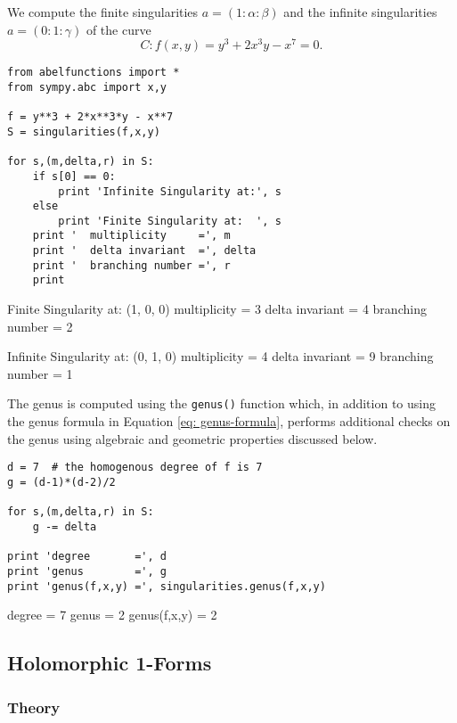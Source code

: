 We compute the finite singularities $a = (1 : \alpha : \beta)$ and the
infinite singularities $a = (0 : 1 : \gamma)$ of the curve
\[
    C : f(x,y) = y^3 + 2x^3y - x^7 = 0.
\]
\begin{lstlisting}
from abelfunctions import *
from sympy.abc import x,y

f = y**3 + 2*x**3*y - x**7
S = singularities(f,x,y)

for s,(m,delta,r) in S:
    if s[0] == 0:
        print 'Infinite Singularity at:', s
    else
        print 'Finite Singularity at:  ', s
    print '  multiplicity     =', m
    print '  delta invariant  =', delta
    print '  branching number =', r
    print
\end{lstlisting}
\begin{pyoutput}
Finite Singularity at:   (1, 0, 0)
  multiplicity     = 3
  delta invariant  = 4
  branching number = 2

Infinite Singularity at: (0, 1, 0)
  multiplicity     = 4
  delta invariant  = 9
  branching number = 1
\end{pyoutput}
The genus is computed using the {\tt genus()} function which, in
addition to using the genus formula in Equation \eqref{eq:
  genus-formula}, performs additional checks on the genus using
algebraic and geometric properties discussed below.
\begin{lstlisting}[firstnumber=16]
d = 7  # the homogenous degree of f is 7
g = (d-1)*(d-2)/2

for s,(m,delta,r) in S:
    g -= delta

print 'degree       =', d
print 'genus        =', g
print 'genus(f,x,y) =', singularities.genus(f,x,y)
\end{lstlisting}
\begin{pyoutput}
degree       = 7
genus        = 2
genus(f,x,y) = 2
\end{pyoutput}

\subsection{Holomorphic 1-Forms}

%
\subsubsection*{Theory}
%

